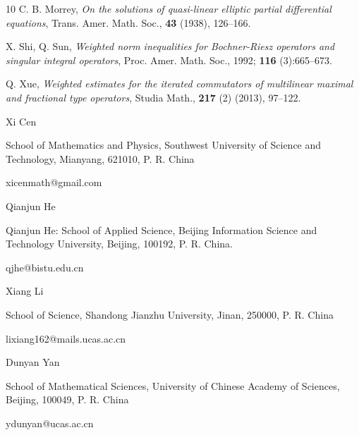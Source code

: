 \documentclass[11pt, twoside, leqno]{article}
\begin{document}
\begin{thebibliography}{10}
	C. B. Morrey, \emph{On the solutions of quasi-linear elliptic partial differential equations}, Trans. Amer. Math. Soc., \textbf{43} (1938), 126--166.
	
	X. Shi, Q. Sun, \emph{Weighted norm inequalities for Bochner-Riesz operators and singular integral operators}, Proc. Amer. Math. Soc., 1992; \textbf{116} (3):665–673.
	
	Q. Xue, \emph{Weighted estimates for the iterated commutators of multilinear maximal and fractional type operators}, Studia Math., \textbf{217} (2) (2013), 97--122.
\end{thebibliography}

\bigskip

\noindent Xi Cen

\smallskip

 School of Mathematics and Physics, Southwest University of Science and Technology, Mianyang, 621010, P. R. China

\smallskip

 xicenmath@gmail.com

\bigskip

\noindent Qianjun He

\smallskip

 Qianjun He: School of Applied Science, Beijing Information Science and Technology University, Beijing, 100192, P. R. China.

\smallskip

 qjhe@bistu.edu.cn

\bigskip

\noindent Xiang Li

\smallskip

 School of Science, Shandong Jianzhu University, Jinan, 250000, P. R. China

\smallskip

 lixiang162@mails.ucas.ac.cn

\bigskip

\noindent Dunyan Yan

\smallskip

 School of Mathematical Sciences, University of Chinese Academy of Sciences, Beijing, 100049, P. R. China

\smallskip

 ydunyan@ucas.ac.cn
\end{document}
